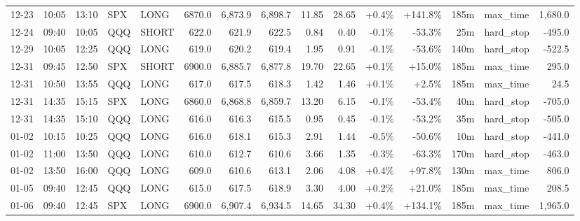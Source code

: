\documentclass[11pt,a4paper,twoside]{article}
\begin{document}
\begin{landscape}
\begin{center}
\begin{longtable}{>{\color{txtmain}}l l l l l r r r r r r r r >{\color{txtmain}}l r}
12-23 & 10:05 & 13:10 & SPX & LONG & 6870.0 & 6,873.9 & 6,898.7 & 11.85 & 28.65 & \textcolor{wingreen}{+0.4\%} & \textcolor{wingreen}{+141.8\%} & 185m & max\_time & \textcolor{wingreen}{1,680.0} \\
12-24 & 09:40 & 10:05 & QQQ & SHORT & 622.0 & 621.9 & 622.5 & 0.84 & 0.40 & \textcolor{lossred}{-0.1\%} & \textcolor{lossred}{-53.3\%} & 25m & hard\_stop & \textcolor{lossred}{-495.0} \\
12-29 & 10:05 & 12:25 & QQQ & LONG & 619.0 & 620.2 & 619.4 & 1.95 & 0.91 & \textcolor{lossred}{-0.1\%} & \textcolor{lossred}{-53.6\%} & 140m & hard\_stop & \textcolor{lossred}{-522.5} \\
12-31 & 09:45 & 12:50 & SPX & SHORT & 6900.0 & 6,885.7 & 6,877.8 & 19.70 & 22.65 & \textcolor{wingreen}{+0.1\%} & \textcolor{wingreen}{+15.0\%} & 185m & max\_time & \textcolor{wingreen}{295.0} \\
12-31 & 10:50 & 13:55 & QQQ & LONG & 617.0 & 617.5 & 618.3 & 1.42 & 1.46 & \textcolor{wingreen}{+0.1\%} & \textcolor{wingreen}{+2.5\%} & 185m & max\_time & \textcolor{wingreen}{24.5} \\
12-31 & 14:35 & 15:15 & SPX & LONG & 6860.0 & 6,868.8 & 6,859.7 & 13.20 & 6.15 & \textcolor{lossred}{-0.1\%} & \textcolor{lossred}{-53.4\%} & 40m & hard\_stop & \textcolor{lossred}{-705.0} \\
12-31 & 14:35 & 15:10 & QQQ & LONG & 616.0 & 616.3 & 615.5 & 0.95 & 0.45 & \textcolor{lossred}{-0.1\%} & \textcolor{lossred}{-53.2\%} & 35m & hard\_stop & \textcolor{lossred}{-505.0} \\
01-02 & 10:15 & 10:25 & QQQ & LONG & 616.0 & 618.1 & 615.3 & 2.91 & 1.44 & \textcolor{lossred}{-0.5\%} & \textcolor{lossred}{-50.6\%} & 10m & hard\_stop & \textcolor{lossred}{-441.0} \\
01-02 & 11:00 & 13:50 & QQQ & LONG & 610.0 & 612.7 & 610.6 & 3.66 & 1.35 & \textcolor{lossred}{-0.3\%} & \textcolor{lossred}{-63.3\%} & 170m & hard\_stop & \textcolor{lossred}{-463.0} \\
01-02 & 13:50 & 16:00 & QQQ & LONG & 609.0 & 610.6 & 613.1 & 2.06 & 4.08 & \textcolor{wingreen}{+0.4\%} & \textcolor{wingreen}{+97.8\%} & 130m & max\_time & \textcolor{wingreen}{806.0} \\
01-05 & 09:40 & 12:45 & QQQ & LONG & 615.0 & 617.5 & 618.9 & 3.30 & 4.00 & \textcolor{wingreen}{+0.2\%} & \textcolor{wingreen}{+21.0\%} & 185m & max\_time & \textcolor{wingreen}{208.5} \\
01-06 & 09:40 & 12:45 & SPX & LONG & 6900.0 & 6,907.4 & 6,934.5 & 14.65 & 34.30 & \textcolor{wingreen}{+0.4\%} & \textcolor{wingreen}{+134.1\%} & 185m & max\_time & \textcolor{wingreen}{1,965.0} \\

\end{longtable}
\end{center}
\end{landscape}
\end{document}

